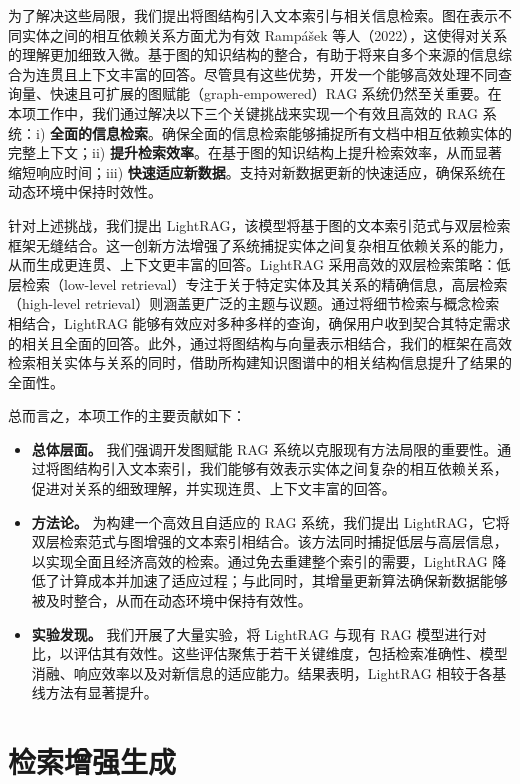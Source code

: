 \documentclass[11pt,UTF8,fontset=fandol]{ctexart}
\begin{document}
为了解决这些局限，我们提出将图结构引入文本索引与相关信息检索。图在表示不同实体之间的相互依赖关系方面尤为有效 Rampášek 等人（2022），这使得对关系的理解更加细致入微。基于图的知识结构的整合，有助于将来自多个来源的信息综合为连贯且上下文丰富的回答。尽管具有这些优势，开发一个能够高效处理不同查询量、快速且可扩展的图赋能（graph-empowered）RAG 系统仍然至关重要。在本项工作中，我们通过解决以下三个关键挑战来实现一个有效且高效的 RAG 系统：i) \textbf{全面的信息检索}。确保全面的信息检索能够捕捉所有文档中相互依赖实体的完整上下文；ii) \textbf{提升检索效率}。在基于图的知识结构上提升检索效率，从而显著缩短响应时间；iii) \textbf{快速适应新数据}。支持对新数据更新的快速适应，确保系统在动态环境中保持时效性。

针对上述挑战，我们提出 LightRAG，该模型将基于图的文本索引范式与双层检索框架无缝结合。这一创新方法增强了系统捕捉实体之间复杂相互依赖关系的能力，从而生成更连贯、上下文更丰富的回答。LightRAG 采用高效的双层检索策略：低层检索（low-level retrieval）专注于关于特定实体及其关系的精确信息，高层检索（high-level retrieval）则涵盖更广泛的主题与议题。通过将细节检索与概念检索相结合，LightRAG 能够有效应对多种多样的查询，确保用户收到契合其特定需求的相关且全面的回答。此外，通过将图结构与向量表示相结合，我们的框架在高效检索相关实体与关系的同时，借助所构建知识图谱中的相关结构信息提升了结果的全面性。

总而言之，本项工作的主要贡献如下：

\begin{itemize}[leftmargin=1.5em]
\item \textbf{总体层面。} 我们强调开发图赋能 RAG 系统以克服现有方法局限的重要性。通过将图结构引入文本索引，我们能够有效表示实体之间复杂的相互依赖关系，促进对关系的细致理解，并实现连贯、上下文丰富的回答。
\item \textbf{方法论。} 为构建一个高效且自适应的 RAG 系统，我们提出 LightRAG，它将双层检索范式与图增强的文本索引相结合。该方法同时捕捉低层与高层信息，以实现全面且经济高效的检索。通过免去重建整个索引的需要，LightRAG 降低了计算成本并加速了适应过程；与此同时，其增量更新算法确保新数据能够被及时整合，从而在动态环境中保持有效性。
\item \textbf{实验发现。} 我们开展了大量实验，将 LightRAG 与现有 RAG 模型进行对比，以评估其有效性。这些评估聚焦于若干关键维度，包括检索准确性、模型消融、响应效率以及对新信息的适应能力。结果表明，LightRAG 相较于各基线方法有显著提升。
\end{itemize}

\section{检索增强生成}
\end{document}
